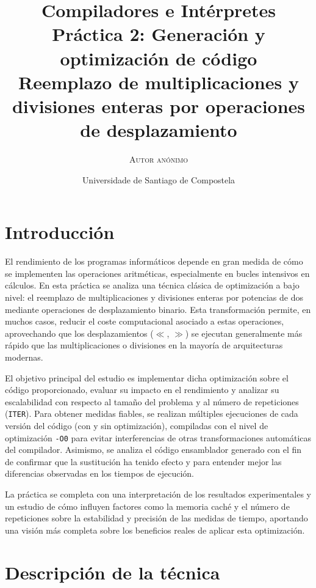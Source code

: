 \documentclass[11pt,a4paper,twoside]{article}
\title{%
	\LARGE \textbf{Compiladores e Intérpretes} \\ \vspace*{1cm} \textbf{Práctica 2: Generación y optimización de código}
	\\ \Large \textbf{Reemplazo de multiplicaciones y divisiones enteras por operaciones de desplazamiento}}
\author{\textsc{Autor anónimo}}
\date{Universidade de Santiago de Compostela}
\theoremstyle{definition}
\begin{document}
	
	\maketitle
	\thispagestyle{empty}
	
	\vspace*{1cm}
	
	\renewcommand{\contentsname}{Índice} %
	\tableofcontents


	\newpage


	\section{Introducción}
	
	El rendimiento de los programas informáticos depende en gran medida de cómo se implementen las operaciones aritméticas, especialmente en bucles intensivos en cálculos. En esta práctica se analiza una técnica clásica de optimización a bajo nivel: el reemplazo de multiplicaciones y divisiones enteras por potencias de dos mediante operaciones de desplazamiento binario. Esta transformación permite, en muchos casos, reducir el coste computacional asociado a estas operaciones, aprovechando que los desplazamientos ($\ll$, $\gg$) se ejecutan generalmente más rápido que las multiplicaciones o divisiones en la mayoría de arquitecturas modernas.
	
	El objetivo principal del estudio es implementar dicha optimización sobre el código proporcionado, evaluar su impacto en el rendimiento y analizar su escalabilidad con respecto al tamaño del problema y al número de repeticiones (\texttt{ITER}). Para obtener medidas fiables, se realizan múltiples ejecuciones de cada versión del código (con y sin optimización), compiladas con el nivel de optimización \texttt{-O0} para evitar interferencias de otras transformaciones automáticas del compilador. Asimismo, se analiza el código ensamblador generado con el fin de confirmar que la sustitución ha tenido efecto y para entender mejor las diferencias observadas en los tiempos de ejecución.
	
	La práctica se completa con una interpretación de los resultados experimentales y un estudio de cómo influyen factores como la memoria caché y el número de repeticiones sobre la estabilidad y precisión de las medidas de tiempo, aportando una visión más completa sobre los beneficios reales de aplicar esta optimización.
	

	\section{Descripción de la técnica}
\end{document}
